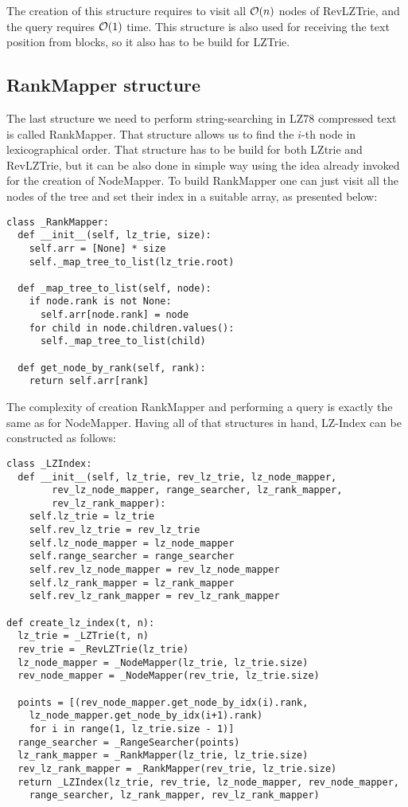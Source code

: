 The creation of this structure requires to visit all $\mathcal{O}(n)$ nodes of RevLZTrie, and the query requires $\mathcal{O}(1)$ time. This structure is also used for receiving the text position from blocks, so it also has to be build for LZTrie.

\subsection{RankMapper structure}
The last structure we need to perform string-searching in LZ78 compressed text is called RankMapper. That structure allows us to find the $i$-th node in lexicographical order. That structure has to be build for both LZtrie and RevLZTrie, but it can be also done in simple way using the idea already invoked for the creation of NodeMapper. To build RankMapper one can just visit all the nodes of the tree and set their index in a suitable array, as presented below:

\begin{verbatim}
class _RankMapper:
  def __init__(self, lz_trie, size):
    self.arr = [None] * size
    self._map_tree_to_list(lz_trie.root)

  def _map_tree_to_list(self, node):
    if node.rank is not None:
      self.arr[node.rank] = node
    for child in node.children.values():
      self._map_tree_to_list(child)

  def get_node_by_rank(self, rank):
    return self.arr[rank]
\end{verbatim}

The complexity of creation RankMapper and performing a query is exactly the same as for NodeMapper. Having all of that structures in hand, LZ-Index can be constructed as follows:

\begin{verbatim}
class _LZIndex:
  def __init__(self, lz_trie, rev_lz_trie, lz_node_mapper, 
        rev_lz_node_mapper, range_searcher, lz_rank_mapper, 
        rev_lz_rank_mapper):
    self.lz_trie = lz_trie
    self.rev_lz_trie = rev_lz_trie
    self.lz_node_mapper = lz_node_mapper
    self.range_searcher = range_searcher
    self.rev_lz_node_mapper = rev_lz_node_mapper
    self.lz_rank_mapper = lz_rank_mapper
    self.rev_lz_rank_mapper = rev_lz_rank_mapper

def create_lz_index(t, n):
  lz_trie = _LZTrie(t, n)
  rev_trie = _RevLZTrie(lz_trie)
  lz_node_mapper = _NodeMapper(lz_trie, lz_trie.size)
  rev_node_mapper = _NodeMapper(rev_trie, lz_trie.size)

  points = [(rev_node_mapper.get_node_by_idx(i).rank,
    lz_node_mapper.get_node_by_idx(i+1).rank)
    for i in range(1, lz_trie.size - 1)]
  range_searcher = _RangeSearcher(points)
  lz_rank_mapper = _RankMapper(lz_trie, lz_trie.size)
  rev_lz_rank_mapper = _RankMapper(rev_trie, lz_trie.size)
  return _LZIndex(lz_trie, rev_trie, lz_node_mapper, rev_node_mapper,
    range_searcher, lz_rank_mapper, rev_lz_rank_mapper)
\end{verbatim}



